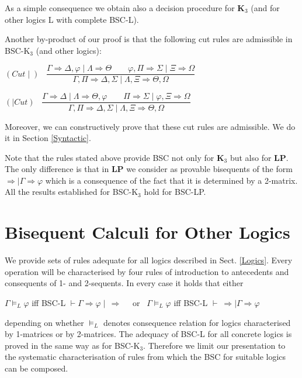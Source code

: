 \documentclass[11pt,a4paper,titlepage]{article}
\theoremstyle{definition}
\newcommand{\3}{\vspace{.3in}}
\newcommand{\2}{\vspace{.2in}}
\newcommand{\1}{\vspace{.1in}}
\newcommand{\5}{\vspace{.05in}}
\begin{document}
As a simple consequence we obtain also a decision procedure for {\bf K$_3$} (and for other logics L with complete BSC-L).

Another by-product of our proof is that the following cut rules are admissible in BSC-K$_3$ (and other logics):


\begin{flushleft}\label{Cut}
	$(Cut\mid)$ \ $\dfrac{\Gamma 
	\Rightarrow  \Delta, \varphi \mid \Lambda\Rightarrow\Theta \qquad
	\varphi, \Pi  \Rightarrow  \Sigma \mid \Xi\Rightarrow\Omega} {\Gamma, \Pi  \Rightarrow  \Delta, \Sigma \mid \Lambda, \Xi\Rightarrow\Theta, \Omega}$
\end{flushleft}

\begin{flushleft}
	$(\mid Cut)$ \ $\dfrac{\Gamma 
	\Rightarrow  \Delta \mid \Lambda\Rightarrow\Theta, \varphi \qquad
	\Pi  \Rightarrow  \Sigma \mid \varphi, \Xi\Rightarrow\Omega} {\Gamma, \Pi  \Rightarrow  \Delta, \Sigma \mid \Lambda, \Xi\Rightarrow\Theta, \Omega}$
\end{flushleft}

Moreover, we can constructively prove that these cut rules are admissible. We do it in Section \ref{Syntactic}. 


Note that the rules stated above provide BSC not only for {\bf K$_3$} but also for {\bf LP}. The only difference is that in {\bf LP} we consider as provable bisequents of the form $\Rightarrow \mid \Gamma\Rightarrow\varphi$ which is a consequence of the fact that it is determined by a 2-matrix.
All the results established for BSC-K$_3$ hold for BSC-LP. 


\section{Bisequent Calculi for Other Logics}\label{OtherLogics}

We provide sets of rules adequate for all logics described in Sect. \ref{Logics}. Every operation
will be characterised by four rules of introduction to antecedents and consequents
of 1- and 2-sequents. In every case it holds that either

\1

$\Gamma\models_L \varphi$ iff BSC-L $\vdash \Gamma\Rightarrow\varphi \mid\,\Rightarrow$ \ \ or \ $\Gamma\models_L \varphi$ iff BSC-L $\vdash \ \Rightarrow \mid \Gamma\Rightarrow\varphi$

\1

depending on whether $\models_L$ denotes consequence relation for logics characterised by 1-matrices or by 2-matrices. The adequacy of BSC-L for all concrete logics is proved in the same way as for BSC-K$_3$. Therefore we limit our presentation to the systematic characterisation of rules from which the BSC for suitable logics can be composed.
\end{document}
